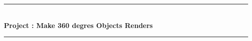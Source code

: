 \begin{titlepage}

  \newcommand{\HRule}{\rule{\linewidth}{0.5mm}} %
  
  \center %
   
  
  
  
  \HRule \\[0.4cm]
  { \huge \bfseries Project : \textsc Make 360 degres Objects Renders  }\\[0.4cm] %
  \HRule \\[0.4cm]

  
  

\end{titlepage}
